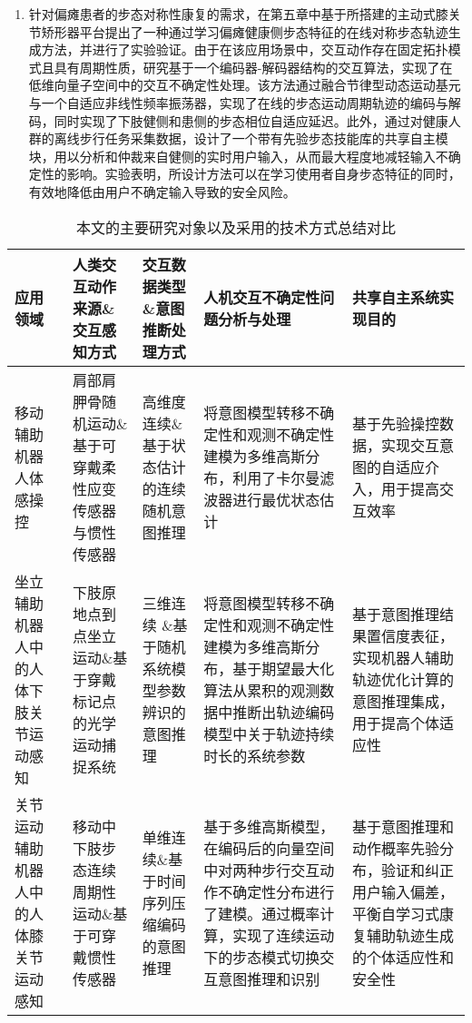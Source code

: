 \begin{enumerate}
\item 针对偏瘫患者的步态对称性康复的需求，在第五章中基于所搭建的主动式膝关节矫形器平台提出了一种通过学习偏瘫健康侧步态特征的在线对称步态轨迹生成方法，并进行了实验验证。由于在该应用场景中，交互动作存在固定拓扑模式且具有周期性质，研究基于一个编码器-解码器结构的交互算法，实现了在低维向量子空间中的交互不确定性处理。该方法通过融合节律型动态运动基元与一个自适应非线性频率振荡器，实现了在线的步态运动周期轨迹的编码与解码，同时实现了下肢健侧和患侧的步态相位自适应延迟。此外，通过对健康人群的离线步行任务采集数据，设计了一个带有先验步态技能库的共享自主模块，用以分析和仲裁来自健侧的实时用户输入，从而最大程度地减轻输入不确定性的影响。实验表明，所设计方法可以在学习使用者自身步态特征的同时，有效地降低由用户不确定输入导致的安全风险。
\end{enumerate}

\begin{table}[htb]
        \centering
        \caption{本文的主要研究对象以及采用的技术方式总结对比}
        \begin{tabular}{p{2cm}p{2cm}p{2cm}p{3.2cm}p{3.2cm}}
        \toprule
                应用领域& 人类交互动作来源\&交互感知方式 & 交互数据类型\&意图推断处理方式 & 人机交互不确定性问题分析与处理 & 共享自主系统实现目的 \\ 
        \midrule
                移动辅助机器人体感操控 & 肩部肩胛骨随机运动\&基于可穿戴柔性应变传感器与惯性传感器 & 高维度连续\&基于状态估计的连续随机意图推理 &将意图模型转移不确定性和观测不确定性建模为多维高斯分布，利用了卡尔曼滤波器进行最优状态估计 & 基于先验操控数据，实现交互意图的自适应介入，用于提高交互效率\\ 
        
                坐立辅助机器人中的人体下肢关节运动感知 & 下肢原地点到点坐立运动\&基于穿戴标记点的光学运动捕捉系统 & 三维连续 \&基于随机系统模型参数辨识的意图推理	&将意图模型转移不确定性和观测不确定性建模为多维高斯分布，基于期望最大化算法从累积的观测数据中推断出轨迹编码模型中关于轨迹持续时长的系统参数 & 基于意图推理结果置信度表征，实现机器人辅助轨迹优化计算的意图推理集成，用于提高个体适应性\\ 
        
                关节运动辅助机器人中的人体膝关节运动感知 & 移动中下肢步态连续周期性运动\&基于可穿戴惯性传感器 & 单维连续\&基于时间序列压缩编码的意图推理	&基于多维高斯模型，在编码后的向量空间中对两种步行交互动作不确定性分布进行了建模。通过概率计算，实现了连续运动下的步态模式切换交互意图推理和识别& 基于意图推理和动作概率先验分布，验证和纠正用户输入偏差，平衡自学习式康复辅助轨迹生成的个体适应性和安全性\\ 
        \bottomrule
        \end{tabular}
        \label{tab:6-1} 
\end{table}


